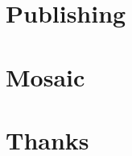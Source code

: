 \documentclass{beamer}
\newcommand{\ft}[1]{\vspace*{.25cm}\raisebox{-.45cm}{%
\contour{MSUgreen!50!yellow}{{\protect\Huge{\protect\textbf{#1}}}}}}
\begin{document}
%	

%

%

\part{Publishing}	






\part{Mosaic}









\part{Thanks}

\end{document}
